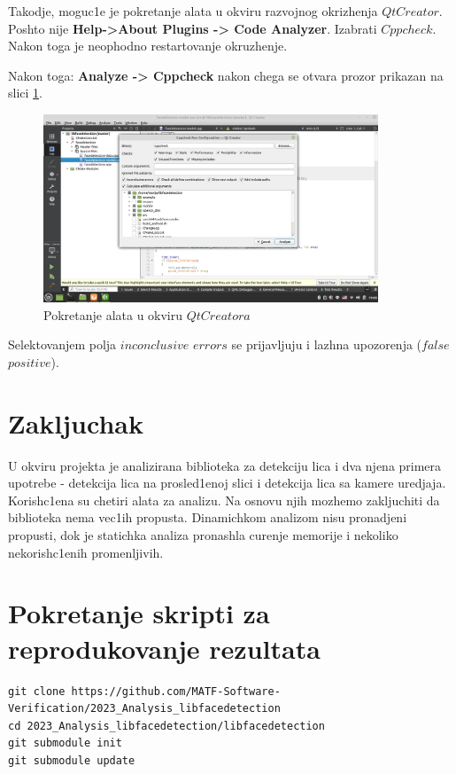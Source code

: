 \documentclass{article}
\begin{document}
\selectfont
Takodje, moguc1e je pokretanje alata u okviru razvojnog okrizhenja $QtCreator.$ Poshto nije 
\selectfont
\textbf{Help->About Plugins -> Code Analyzer}.
\selectfont
Izabrati $Cppcheck$. Nakon toga 
je neophodno restartovanje okruzhenje.

Nakon toga: 
\selectfont
\textbf{Analyze -> Cppcheck}
\selectfont
nakon chega se otvara prozor prikazan na slici \ref{qt:cppcheck}.

\begin{figure}[H]
    \centering
    \includegraphics[width=10cm]{img/cppCheck/cppCheckQt.png}
    \caption{Pokretanje alata u okviru $QtCreatora$}
    \label{qt:cppcheck}
\end{figure}

Selektovanjem polja $inconclusive$ $errors$ se prijavljuju i lazhna upozorenja ($false$ $positive$). 

\section{Zakljuchak}
U okviru projekta je analizirana biblioteka za detekciju lica i dva njena primera upotrebe - detekcija lica na prosled1enoj slici i detekcija lica sa kamere uredjaja. Korish\-c1ena su chetiri alata za analizu. Na osnovu njih mozhemo zakljuchiti da biblioteka nema vec1ih propusta. Dinamichkom analizom nisu pronadjeni propusti, dok je statichka analiza pronashla curenje memorije i nekoliko nekorish\-c1enih promenljivih.

\section{Pokretanje skripti za reprodukovanje rezultata}
\selectfont


\begin{verbatim}
git clone https://github.com/MATF-Software-Verification/2023_Analysis_libfacedetection
cd 2023_Analysis_libfacedetection/libfacedetection
git submodule init
git submodule update
\end{verbatim}
\end{document}
